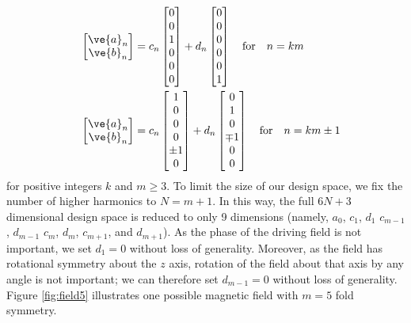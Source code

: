\begin{align}
    \quad \begin{bmatrix} \ve{a}_{n} \\ \ve{b}_{n} \end{bmatrix} &= c_{n} \begin{bmatrix} 0\\0\\1\\0\\0\\0 \end{bmatrix} + d_{n} \begin{bmatrix} 0\\0\\0\\0\\0\\1 \end{bmatrix} \quad \text{for} \quad n=km
    \\
    \quad \begin{bmatrix} \ve{a}_{n} \\ \ve{b}_{n} \end{bmatrix} &= c_{n} \begin{bmatrix} 1\\0\\0\\0\\\pm1\\0 \end{bmatrix} + d_{n} \begin{bmatrix} 0\\1\\0\\\mp1\\0\\0 \end{bmatrix} \quad \text{for} \quad n=km \pm 1
\end{align}
for positive integers $k$ and $m\geq3$. To limit the size of our design space, we fix the number of higher harmonics to $N=m+1$. In this way, the full $6N+3$ dimensional design space is reduced to only 9 dimensions (namely, $a_0$, $c_1$, $d_1$ $c_{m-1}$, $d_{m-1}$ $c_{m}$, $d_{m}$, $c_{m+1}$, and $d_{m+1}$). As the phase of the driving field is not important, we set $d_1=0$ without loss of generality.  Moreover, as the field has rotational symmetry about the $z$ axis, rotation of the field about that axis by any angle is not important; we can therefore set $d_{m-1}=0$ without loss of generality.  Figure \ref{fig:field5} illustrates one possible magnetic field with $m=5$ fold symmetry.

